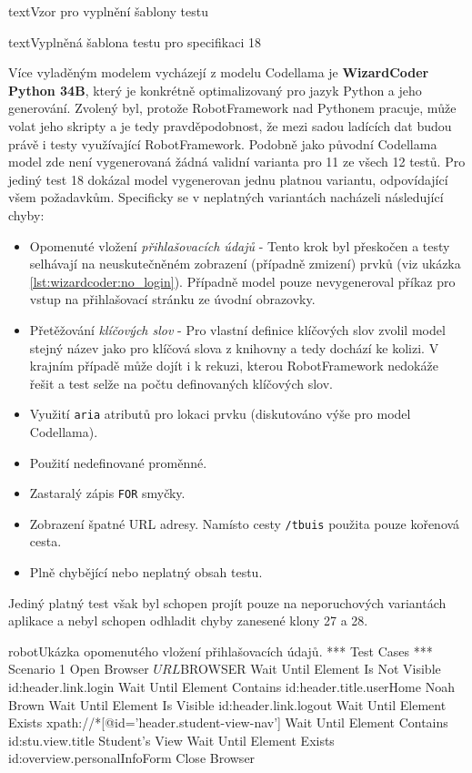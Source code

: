 \documentclass[czech, ma, kiv, he, iso690numb, pdf, viewonly]{fasthesis}
\begin{document}
\begin{code}{text}{Vzor pro vyplnění šablony testu \label{lst:template}}
{\begin{code}{text}{Vyplněná šablona testu pro specifikaci 18 \label{lst:spec18}}
{            Více vyladěným modelem vycházejí z modelu Codellama je \textbf{WizardCoder Python 34B}, který je konkrétně optimalizovaný pro jazyk Python a jeho generování. Zvolený byl, protože RobotFramework nad Pythonem pracuje, může volat jeho skripty a je tedy pravděpodobnost, že mezi sadou ladících dat budou právě i testy využívající RobotFramework. Podobně jako původní Codellama model zde není vygenerovaná žádná validní varianta pro 11 ze všech 12 testů. Pro jediný test 18 dokázal model vygenerovan jednu platnou variantu, odpovídající všem požadavkům. Specificky se v neplatných variantách nacházeli následující chyby:
            \begin{itemize}
                \item Opomenuté vložení \textit{přihlašovacích údajů} - Tento krok byl přeskočen a testy selhávají na neuskutečněném zobrazení (případně zmizení) prvků (viz ukázka \ref{lst:wizardcoder:no_login}). Případně model pouze nevygeneroval příkaz pro vstup na přihlašovací stránku ze úvodní obrazovky.
                \item Přetěžování \textit{klíčových slov} - Pro vlastní definice klíčových slov zvolil model stejný název jako pro klíčová slova z knihovny a tedy dochází ke kolizi. V krajním případě může dojít i k rekuzi, kterou RobotFramework nedokáže řešit a test selže na počtu definovaných klíčových slov.
                \item Využití \verb|aria| atributů pro lokaci prvku (diskutováno výše pro model Codellama).
                \item Použití nedefinované proměnné.
                \item Zastaralý zápis \verb|FOR| smyčky.
                \item Zobrazení špatné URL adresy. Namísto cesty \verb|/tbuis| použita pouze kořenová cesta.
                \item Plně chybějící nebo neplatný obsah testu.
            \end{itemize}
            \noindent Jediný platný test však byl schopen projít pouze na neporuchových variantách aplikace a nebyl schopen odhladit chyby zanesené klony 27 a 28.

            \begin{code}{robot}{Ukázka opomenutého vložení přihlašovacích údajů. \label{lst:wizardcoder:no_login}}
*** Test Cases ***
Scenario 1
    Open Browser    ${URL}    ${BROWSER}
    Wait Until Element Is Not Visible    id:header.link.login
    Wait Until Element Contains    id:header.title.userHome    Noah Brown
    Wait Until Element Is Visible    id:header.link.logout
    Wait Until Element Exists    xpath://*[@id='header.student-view-nav']
    Wait Until Element Contains    id:stu.view.title    Student's View
    Wait Until Element Exists    id:overview.personalInfoForm
    Close Browser
            \end{code}

}
\end{code}}
\end{code}
\end{document}
